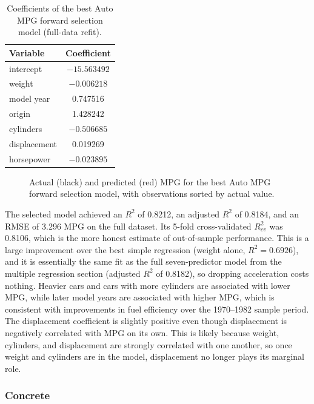 \begin{table}[H]
    \centering
    \caption{Coefficients of the best Auto MPG forward selection model (full-data refit).}
    \label{tab:fs-auto-coef}
    \begin{tabular}{lc}
        \hline
        Variable & Coefficient \\
        \hline
        intercept & $-15.563492$ \\
        weight & $-0.006218$ \\
        model year & 0.747516 \\
        origin & 1.428242 \\
        cylinders & $-0.506685$ \\
        displacement & 0.019269 \\
        horsepower & $-0.023895$ \\
        \hline
    \end{tabular}
\end{table}

\begin{figure}[H]
    \centering
    \caption{Actual (black) and predicted (red) MPG for the best Auto MPG forward selection model, with observations sorted by actual value.}
    \label{fig:fs-auto-fit}
\end{figure}

The selected model achieved an $R^2$ of 0.8212, an adjusted $R^2$ of 0.8184, and an RMSE of 3.296 MPG on the full dataset. Its 5-fold cross-validated $R^2_{cv}$ was 0.8106, which is the more honest estimate of out-of-sample performance. This is a large improvement over the best simple regression (weight alone, $R^2 = 0.6926$), and it is essentially the same fit as the full seven-predictor model from the multiple regression section (adjusted $R^2$ of 0.8182), so dropping acceleration costs nothing. Heavier cars and cars with more cylinders are associated with lower MPG, while later model years are associated with higher MPG, which is consistent with improvements in fuel efficiency over the 1970--1982 sample period. The displacement coefficient is slightly positive even though displacement is negatively correlated with MPG on its own. This is likely because weight, cylinders, and displacement are strongly correlated with one another, so once weight and cylinders are in the model, displacement no longer plays its marginal role.

\subsubsection{Concrete}

